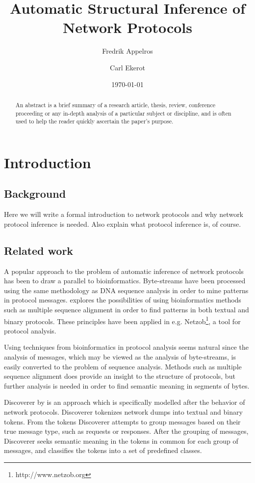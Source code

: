 \documentclass[a4paper]{report}
\begin{document}
\title{Automatic Structural Inference of Network Protocols}
\author{Fredrik Appelros \and Carl Ekerot}
\date{\today}
\maketitle

\begin{abstract}
An abstract is a brief summary of a research article, thesis, review,
conference proceeding or any in-depth analysis of a particular subject or
discipline, and is often used to help the reader quickly ascertain the paper's
purpose.
\end{abstract}

\tableofcontents

\chapter{Introduction}

\section{Background}
Here we will write a formal introduction to network protocols and why network
protocol inference is needed. Also explain what protocol inference is, of
course.

\section{Related work}
A popular approach to the problem of automatic inference of network protocols
has been to draw a parallel to bioinformatics. Byte-streams have been
processed using the same methodology as DNA sequence analysis in order
to mine patterns in protocol messages. \citep{beddoe05} explores the
possibilities of using bioinformatics methods such as multiple sequence
alignment in order to find patterns in both textual and binary protocols. These
principles have been applied in e.g. Netzob\footnote{http://www.netzob.org}, a
tool for protocol analysis.

Using techniques from bioinformatics in protocol analysis seems natural since
the analysis of messages, which may be viewed as the analysis of byte-streams,
is easily converted to the problem of sequence analysis. Methods such as
multiple sequence alignment does provide an insight to the structure of
protocols, but further analysis is needed in order to find semantic meaning in
segments of bytes.

Discoverer by \citeauthor{cui07} is an approach which is specifically modelled
after the behavior of network protocols. Discoverer tokenizes
network dumps into textual and binary tokens. From the tokens Discoverer
attempts to group messages based on their true message type, such as requests
or responses. After the grouping of messages, Discoverer seeks semantic meaning
in the tokens in common for each group of messages, and classifies the tokens
into a set of predefined classes. 
\end{document}
